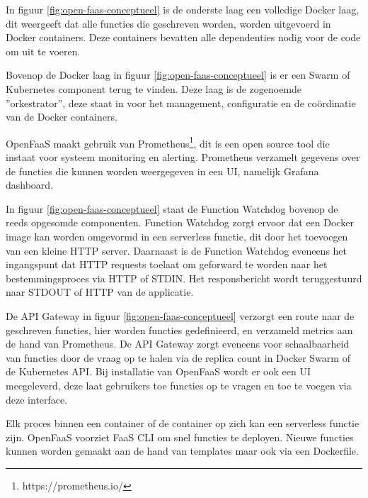 \begin{description}[style=unboxed, labelwidth=\linewidth, listparindent =0pt]
    \item[Docker laag]
    In figuur \ref{fig:open-faas-conceptueel} is de onderste laag een volledige Docker laag, dit weergeeft dat alle functies die geschreven worden, worden uitgevoerd in Docker containers. Deze containers bevatten alle dependenties nodig voor de code om uit te voeren.
    \\
    
    \item[Swarm/Kubernetes]
    Bovenop de Docker laag in figuur \ref{fig:open-faas-conceptueel} is er een Swarm of Kubernetes component terug te vinden. Deze laag is de zogenoemde ''orkestrator'', deze staat in voor het management, configuratie en de coördinatie van de Docker containers.
    \\
    
    \item[Prometheus]
    OpenFaaS maakt gebruik van Prometheus\footnote{https://prometheus.io/}, dit is een open source tool die instaat voor systeem monitoring en alerting. Prometheus verzamelt gegevens over de functies die kunnen worden weergegeven in een UI, namelijk Grafana dashboard.
    \\
    
    \item[Function Watchdog]
    In figuur \ref{fig:open-faas-conceptueel} staat de Function Watchdog bovenop de reeds opgesomde componenten. Function Watchdog zorgt ervoor dat een Docker image kan worden omgevormd in een serverless functie, dit door het toevoegen van een kleine HTTP server. Daarnaast is de Function Watchdog eveneens het ingangspunt dat HTTP requests toelaat om geforward te worden naar het bestemmingsproces via HTTP of STDIN. Het responsbericht wordt teruggestuurd naar STDOUT of HTTP van de applicatie. \autocite{Ellis2019}
    \newline
    
    \item[API Gateway/UI Portal]
    De API Gateway in figuur \ref{fig:open-faas-conceptueel} verzorgt een route naar de geschreven functies, hier worden functies gedefinieerd, en verzameld metrics aan de hand van Prometheus. De API Gateway zorgt eveneens voor schaalbaarheid van functies door de vraag op te halen via de replica count in Docker Swarm of de Kubernetes API. Bij installatie van OpenFaaS wordt er ook een UI meegeleverd, deze laat gebruikers toe functies op te vragen en toe te voegen via deze interface. \autocite{Ellis2019} 
    \\
    
    \item[CLI]
    Elk proces binnen een container of de container op zich kan een serverless functie zijn. OpenFaaS voorziet FaaS CLI om snel functies te deployen. Nieuwe functies kunnen worden gemaakt aan de hand van templates maar ook via een Dockerfile. \autocite{Ellis2019}  
\end{description}

